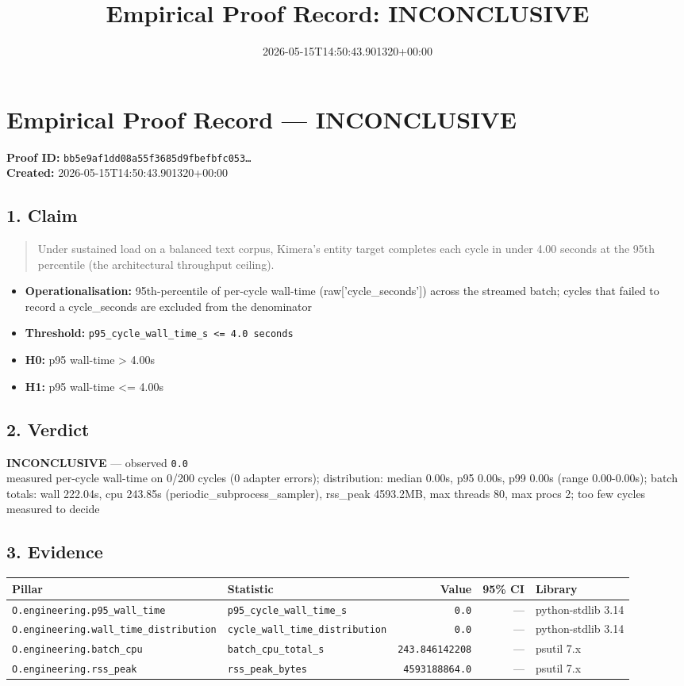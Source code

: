 \documentclass{article}
\title{Empirical Proof Record: INCONCLUSIVE}
\date{2026-05-15T14:50:43.901320+00:00}
\begin{document}
\maketitle
\section*{Empirical Proof Record --- \textcolor{inconclusive}{\textbf{INCONCLUSIVE}}}
\textbf{Proof ID:} \texttt{bb5e9af1dd08a55f3685d9fbefbfc053\dots}\\
\textbf{Created:} 2026-05-15T14:50:43.901320+00:00
\subsection*{1. Claim}
\begin{quote}Under sustained load on a balanced text corpus, Kimera's entity target completes each cycle in under 4.00 seconds at the 95th percentile (the architectural throughput ceiling).\end{quote}
\begin{itemize}
\item \textbf{Operationalisation:} 95th-percentile of per-cycle wall-time (raw['cycle\_seconds']) across the streamed batch; cycles that failed to record a cycle\_seconds are excluded from the denominator
\item \textbf{Threshold:} \texttt{p95\_cycle\_wall\_time\_s <= 4.0 seconds}
\item \textbf{H0:} p95 wall-time > 4.00s
\item \textbf{H1:} p95 wall-time <= 4.00s
\end{itemize}
\subsection*{2. Verdict}
\textcolor{inconclusive}{\textbf{INCONCLUSIVE}} --- observed \texttt{0.0}\\
measured per-cycle wall-time on 0/200 cycles (0 adapter errors); distribution: median 0.00s, p95 0.00s, p99 0.00s (range 0.00-0.00s); batch totals: wall 222.04s, cpu 243.85s (periodic\_subprocess\_sampler), rss\_peak 4593.2MB, max threads 80, max procs 2; too few cycles measured to decide
\subsection*{3. Evidence}
\begin{tabular}{llrrl}\toprule
\textbf{Pillar} & \textbf{Statistic} & \textbf{Value} & \textbf{95\% CI} & \textbf{Library} \\\midrule
\texttt{O.engineering.p95\_wall\_time} & \texttt{p95\_cycle\_wall\_time\_s} & \texttt{0.0} & --- & python-stdlib 3.14 \\
\texttt{O.engineering.wall\_time\_distribution} & \texttt{cycle\_wall\_time\_distribution} & \texttt{0.0} & --- & python-stdlib 3.14 \\
\texttt{O.engineering.batch\_cpu} & \texttt{batch\_cpu\_total\_s} & \texttt{243.846142208} & --- & psutil 7.x \\
\texttt{O.engineering.rss\_peak} & \texttt{rss\_peak\_bytes} & \texttt{4593188864.0} & --- & psutil 7.x \\
\bottomrule\end{tabular}
\end{document}
